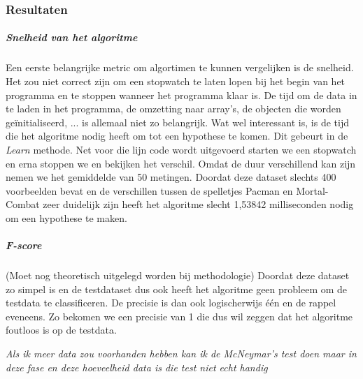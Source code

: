 \subsubsection{Resultaten}
\subparagraph{Snelheid van het algoritme} 
Een eerste belangrijke metric om algortimen te kunnen vergelijken is de snelheid. Het zou niet correct zijn om een stopwatch te laten lopen bij het begin van het programma en te stoppen wanneer het programma klaar is. De tijd om de data in te laden in het programma, de omzetting naar array's, de objecten die worden geïnitialiseerd, ... is allemaal niet zo belangrijk. Wat wel interessant is, is de tijd die het algoritme nodig heeft om tot een hypothese te komen. Dit gebeurt in de \textit{Learn} methode. 
Net voor die lijn code wordt uitgevoerd starten we een stopwatch en erna stoppen we en bekijken het verschil. Omdat de duur verschillend kan zijn nemen we het gemiddelde van 50 metingen. 
Doordat deze dataset slechts 400 voorbeelden bevat en de verschillen tussen de spelletjes Pacman en Mortal-Combat zeer duidelijk zijn heeft het algoritme slecht 1,53842 milliseconden nodig om een hypothese te maken. 
\subparagraph{F-score} (Moet nog theoretisch uitgelegd worden bij methodologie)
\newline
Doordat deze dataset zo simpel is en de testdataset dus ook heeft het algoritme geen probleem om de testdata te classificeren. De precisie is dan ook logischerwijs één en de rappel eveneens.
Zo bekomen we een precisie van 1 die dus wil zeggen dat het algoritme foutloos is op de testdata.  


\textit{Als ik meer data zou voorhanden hebben kan ik de McNeymar's test doen maar in deze fase en deze hoeveelheid data is die test niet echt handig}

